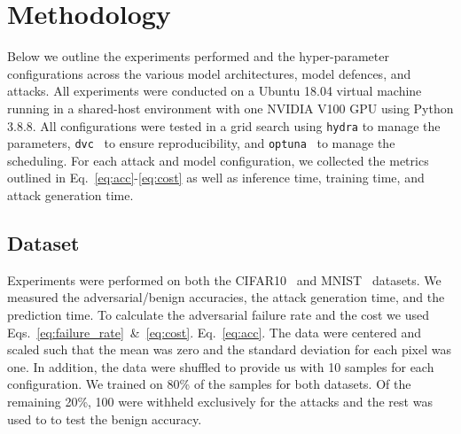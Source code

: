 \section{Methodology}
\label{methods}
Below we outline the experiments performed and the hyper-parameter configurations across the various model architectures, model defences, and attacks. All experiments were conducted on a Ubuntu 18.04 virtual machine running in a shared-host environment with one NVIDIA V100 GPU using Python 3.8.8. All configurations were tested in a grid search using \texttt{hydra} \citep{hydra} to manage the parameters, \texttt{dvc}~\citep{dvc} to ensure reproducibility, and \texttt{optuna}~\citep{optuna} to manage the scheduling. For each attack and model configuration, we collected the metrics outlined in Eq.~\ref{eq:acc}-\ref{eq:cost} as well as inference time, training time, and attack generation time.

\subsection{Dataset}
\label{dataset}
Experiments were performed on both the CIFAR10~\citep{cifar} and MNIST~\citep{mnist} datasets. We measured the adversarial/benign accuracies, the attack generation time, and the prediction time. To calculate the adversarial failure rate and the cost we used Eqs.~\ref{eq:failure_rate}~\&~\ref{eq:cost}. Eq.~\ref{eq:acc}. The data were centered and scaled such that the mean was zero and the standard deviation for each pixel was one. In addition, the data were shuffled to provide us with 10 samples for each configuration. We trained on 80\% of the samples for both datasets. Of the remaining 20\%, 100 were withheld exclusively for the attacks and the rest was used to to test the benign accuracy.

